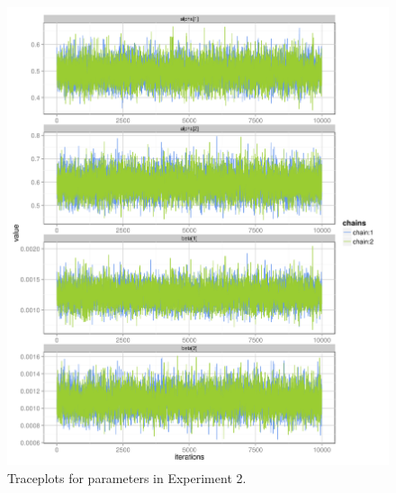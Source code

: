 \begin{figure}[ht!]
  \centering
  \includegraphics{figures/main/trace_2.png}
  \caption{Traceplots for parameters in Experiment 2.}
  \label{fig:trace_2}
\end{figure}
